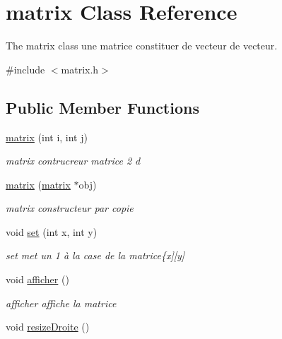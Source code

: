 \hypertarget{classmatrix}{}\section{matrix Class Reference}
\label{classmatrix}


The matrix class une matrice constituer de vecteur de vecteur.  




{\ttfamily \#include $<$matrix.\+h$>$}

\subsection*{Public Member Functions}
\begin{DoxyCompactItemize}
\item 
\hyperlink{classmatrix_ac060122c49720709c23dd7e4e630eaff}{matrix} (int i, int j)
\begin{DoxyCompactList}\small\item\em matrix contrucreur matrice 2 d \end{DoxyCompactList}\item 
\hyperlink{classmatrix_afe22b82beac968bb2069201000e9b4bf}{matrix} (\hyperlink{classmatrix}{matrix} $\ast$obj)
\begin{DoxyCompactList}\small\item\em matrix constructeur par copie \end{DoxyCompactList}\item 
void \hyperlink{classmatrix_ab298b1344f474debfabd2db0e31e84c9}{set} (int x, int y)
\begin{DoxyCompactList}\small\item\em set met un 1 à la case de la matrice\{x\mbox{]}\mbox{[}y\mbox{]} \end{DoxyCompactList}\item 
void \hyperlink{classmatrix_ab039eefe55f3e60da940243505d20800}{afficher} ()\hypertarget{classmatrix_ab039eefe55f3e60da940243505d20800}{}\label{classmatrix_ab039eefe55f3e60da940243505d20800}

\begin{DoxyCompactList}\small\item\em afficher affiche la matrice \end{DoxyCompactList}\item 
void \hyperlink{classmatrix_a9b1fbe36a149d15a05cf43b1a2c01ee5}{resize\+Droite} ()\hypertarget{classmatrix_a9b1fbe36a149d15a05cf43b1a2c01ee5}{}\label{classmatrix_a9b1fbe36a149d15a05cf43b1a2c01ee5}


\end{DoxyCompactItemize}
